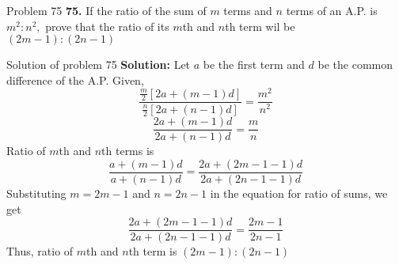 \documentclass[aspectratio=1610,8pt]{beamer}
\begin{document}
\begin{frame}{Problem 75}
  \textbf{75.} If the ratio of the sum of $m$ terms and $n$ terms of an A.P. is
  $m^2:n^2,$ prove that the ratio of its $m$th and $n$th term wil be $(2m -
  1):(2n -1)$
\end{frame}
\begin{frame}{Solution of problem 75}
  \textbf{Solution:} Let $a$ be the first term and $d$ be the common difference
  of the A.P. Given,
  $$\frac{\frac{m}{2}[2a + (m - 1)d]}{\frac{n}{2}[2a + (n - 1)d]} =
  \frac{m^2}{n^2}$$
  $$\frac{2a + (m - 1)d}{2a + (n - 1)d} = \frac{m}{n}$$
  Ratio of $m$th and $n$th terms is
  $$\frac{a + (m - 1)d}{a + (n - 1)d} = \frac{2a + (2m - 1 -1)d}{2a + (2n - 1 -
    1)d}$$
  Substituting $m = 2m -1$ and $n = 2n - 1$ in the equation for ratio of sums,
  we get
  $$\frac{2a + (2m - 1 - 1)d}{2a + (2n - 1 - 1)d} = \frac{2m - 1}{2n - 1}$$
  Thus, ratio of $m$th and $n$th term is $(2m - 1): (2n - 1)$
\end{frame}
\end{document}
